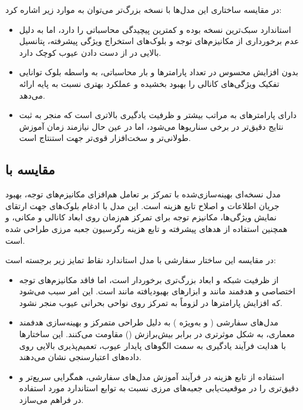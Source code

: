 \documentclass[a4paper, 10pt, twocolumn]{article}
\begin{document}
	در مقایسه ساختاری این مدل‌ها با نسخه بزرگ‌تر  می‌توان به موارد زیر اشاره کرد:
	\begin{itemize}
		\item {} استاندارد سبک‌ترین نسخه بوده و کمترین پیچیدگی محاسباتی را دارد، اما به دلیل عدم برخورداری از مکانیزم‌های توجه و بلوک‌های استخراج ویژگی پیشرفته، پتانسیل بالایی در از دست دادن عیوب کوچک دارد.
		\item {} بدون افزایش محسوس در تعداد پارامترها و بار محاسباتی، به واسطه بلوک  توانایی تفکیک ویژگی‌های کانالی را بهبود بخشیده و عملکرد بهتری نسبت به  پایه ارائه می‌دهد.
		\item {} دارای پارامترهای به مراتب بیشتر و ظرفیت یادگیری بالاتری است که منجر به ثبت نتایج دقیق‌تر در برخی سناریوها می‌شود، اما در عین حال نیازمند زمان آموزش طولانی‌تر و سخت‌افزار قوی‌تر جهت استنتاج است.
	\end{itemize}
	
	
	\subsection{مقایسه با }
	
	مدل  نسخه‌ای بهینه‌سازی‌شده با تمرکز بر تعامل هم‌افزای مکانیزم‌های توجه، بهبود جریان اطلاعات و اصلاح تابع هزینه است. این مدل با ادغام بلوک‌های  جهت ارتقای نمایش ویژگی‌ها، مکانیزم توجه  برای تمرکز هم‌زمان روی ابعاد کانالی و مکانی، و همچنین استفاده از هدهای پیشرفته و تابع هزینه رگرسیون جعبه مرزی  طراحی شده است.
	
	در مقایسه این ساختار سفارشی با مدل استاندارد  نقاط تمایز زیر برجسته است:
	\begin{itemize}
		\item {} از ظرفیت شبکه و ابعاد بزرگ‌تری برخوردار است، اما فاقد مکانیزم‌های توجه اختصاصی و هدفمند مانند  و ابزارهای بهبودیافته مانند  است. این امر سبب می‌شود که افزایش پارامترها در  لزوماً به تمرکز روی نواحی بحرانی عیوب منجر نشود.
		\item مدل‌های سفارشی ( و به‌ویژه ) به دلیل طراحی متمرکز و بهینه‌سازی هدفمند معماری، به شکل موثرتری در برابر بیش‌برازش () مقاومت می‌کنند. این ساختارها با هدایت فرآیند یادگیری به سمت الگوهای پایدار عیوب، تعمیم‌پذیری بالایی روی داده‌های اعتبارسنجی نشان می‌دهند.
		\item استفاده از تابع هزینه  در فرآیند آموزش مدل‌های سفارشی، همگرایی سریع‌تر و دقیق‌تری را در موقعیت‌یابی جعبه‌های مرزی نسبت به توابع استاندارد مورد استفاده در  فراهم می‌سازد.
	\end{itemize}
	
\end{document}
